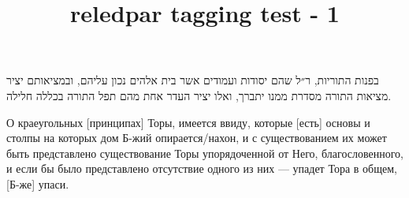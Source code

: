\documentclass{book}
\title{reledpar tagging test - 1}
\begin{document}
\begin{pairs}

\begin{Rightside} 
\begin{RTL}
\begin{hebrew}
\beginnumbering
\pstart
{}
\pend
\pstart
בפנות התוריות, ר״ל שהם יסודות ועמודים אשר בית אלהים נכון עליהם, ובמציאותם יציר מציאות התורה מסדרת ממנו יתברך, ואלו יציר העדר אחת מהם תפל התורה בכללה חלילה.
\pend    
\endnumbering
\end{hebrew}
\end{RTL}
\end{Rightside}




\begin{Leftside} 
\begin{russian}
\beginnumbering
\pstart
{}   
\pend 
\pstart
О краеугольных [принципах] Торы, имеется ввиду, которые [есть] основы и столпы на которых дом Б-жий опирается/нахон, и с существованием их может быть представлено существование Торы упорядоченной от Него, благословенного, и если бы было представлено отсутствие одного из них — упадет Тора в общем, [Б-же] упаси.
\pend
\endnumbering
\end{russian}
\end{Leftside}

\end{pairs}
\Columns
\end{document}
